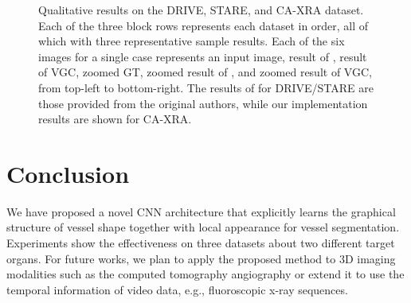 \documentclass[runningheads,a4paper]{llncs}
\begin{document}
\begin{figure*}[t]
\begin{minipage}{1\linewidth}
	\end{minipage}
	\caption{Qualitative results on the DRIVE, STARE, and CA-XRA dataset. Each of the three block rows represents each dataset in order, all of which with three representative sample results. Each of the six images for a single case represents an input image, result of \cite{maninis16}, result of VGC, zoomed GT, zoomed result of \cite{maninis16}, and zoomed result of VGC, from top-left to bottom-right. The results of \cite{maninis16} for DRIVE/STARE are those provided from the original authors, while our implementation results are shown for CA-XRA.}
	\label{fig:qual_res}
\end{figure*}

\section{Conclusion}

We have proposed a novel CNN architecture that explicitly learns the graphical structure of vessel shape together with local appearance for vessel segmentation. Experiments show the effectiveness on three datasets about two different target organs. For future works, we plan to apply the proposed method to 3D imaging modalities such as the computed tomography angiography or extend it to use the temporal information of video data, e.g., fluoroscopic x-ray sequences.
\end{document}
